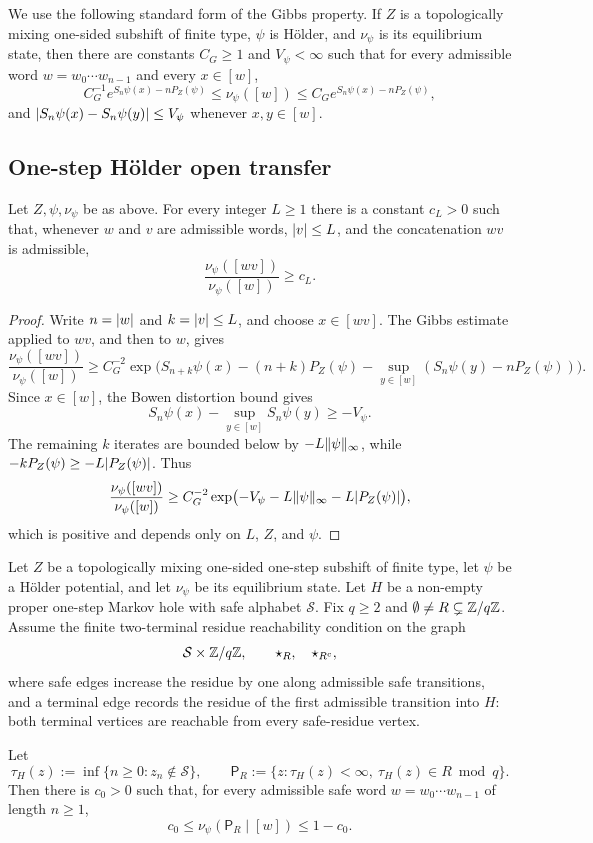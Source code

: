 We use the following standard form of the Gibbs property.  If \(Z\) is a
topologically mixing one-sided subshift of finite type, \(\psi\) is
H\"older, and \(\nu_\psi\) is its equilibrium state, then there are
constants \(C_G\geq1\) and \(V_\psi<\infty\) such that for every
admissible word \(w=w_0\cdots w_{n-1}\) and every \(x\in[w]\),
\[
  C_G^{-1}e^{S_n\psi(x)-nP_Z(\psi)}
  \leq \nu_\psi([w])
  \leq
  C_G e^{S_n\psi(x)-nP_Z(\psi)},
\]
and \(\lvert S_n\psi(x)-S_n\psi(y)\rvert\leq V_\psi\) whenever
\(x,y\in[w]\).


\subsection{One-step H\"older open transfer}
\begin{lemma}
\label{lem:holder-gibbs-continuation}
Let \(Z,\psi,\nu_\psi\) be as above.  For every integer \(L\geq1\) there
is a constant \(c_L>0\) such that, whenever \(w\) and \(v\) are
admissible words, \(\lvert v\rvert\leq L\), and the concatenation \(wv\) is
admissible,
\[
  \frac{\nu_\psi([wv])}{\nu_\psi([w])}\geq c_L .
\]
\end{lemma}

\begin{proof}
Write \(n=\lvert w\rvert\) and \(k=\lvert v\rvert\leq L\), and choose
\(x\in[wv]\).  The Gibbs estimate applied to \(wv\), and then to \(w\),
gives
\[
  \frac{\nu_\psi([wv])}{\nu_\psi([w])}
  \geq
  C_G^{-2}
  \exp\bigl(S_{n+k}\psi(x)-(n+k)P_Z(\psi)
            -\sup_{y\in[w]}(S_n\psi(y)-nP_Z(\psi))\bigr).
\]
Since \(x\in[w]\), the Bowen distortion bound gives
\[
  S_n\psi(x)-\sup_{y\in[w]}S_n\psi(y)\geq -V_\psi.
\]
The remaining \(k\) iterates are bounded below by
\(-L\lVert \psi\rVert_\infty\), while \(-kP_Z(\psi)\geq -L\lvert P_Z(\psi)\rvert\).
Thus
\[
  \frac{\nu_\psi([wv])}{\nu_\psi([w])}
  \geq
  C_G^{-2}
  \exp\bigl(-V_\psi-L\lVert \psi\rVert_\infty
              -L\lvert P_Z(\psi)\rvert\bigr),
\]
which is positive and depends only on \(L\), \(Z\), and \(\psi\).
\end{proof}

\begin{lemma}
\label{lem:holder-extension-ambiguity}
Let \(Z\) be a topologically mixing one-sided one-step subshift of finite
type, let \(\psi\) be a H\"older potential, and let \(\nu_\psi\) be its
equilibrium state.  Let \(H\) be a non-empty proper one-step Markov hole
with safe alphabet \(\mathcal S\).  Fix \(q\geq2\) and
\(\emptyset\neq R\subsetneq\mathbb{Z}/q\mathbb{Z}\).  Assume the finite two-terminal
residue reachability condition on the graph
\[
  \mathcal S\times\mathbb{Z}/q\mathbb{Z},\qquad \star_R,\quad\star_{R^c},
\]
where safe edges increase the residue by one along admissible safe
transitions, and a terminal edge records the residue of the first
admissible transition into \(H\): both terminal vertices are reachable
from every safe-residue vertex.

Let
\[
  \tau_H(z):=\inf\{n\geq0:z_n\notin\mathcal S\},
  \qquad
  \mathsf P_R:=\{z:\tau_H(z)<\infty,\ \tau_H(z)\in R\bmod q\}.
\]
Then there is \(c_0>0\) such that, for every admissible safe word
\(w=w_0\cdots w_{n-1}\) of length \(n\geq1\),
\[
  c_0
  \leq
  \nu_\psi(\mathsf P_R\mid[w])
  \leq
  1-c_0 .
\]
\end{lemma}

